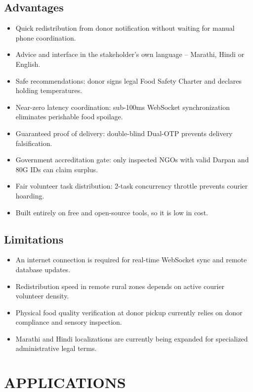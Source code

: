 \documentclass[12pt,a4paper]{article}
\begin{document}
\subsection{Advantages}
\begin{itemize}
    \item Quick redistribution from donor notification without waiting for manual phone coordination.
    \item Advice and interface in the stakeholder's own language -- Marathi, Hindi or English.
    \item Safe recommendations: donor signs legal Food Safety Charter and declares holding temperatures.
    \item Near-zero latency coordination: sub-100ms WebSocket synchronization eliminates perishable food spoilage.
    \item Guaranteed proof of delivery: double-blind Dual-OTP prevents delivery falsification.
    \item Government accreditation gate: only inspected NGOs with valid Darpan and 80G IDs can claim surplus.
    \item Fair volunteer task distribution: 2-task concurrency throttle prevents courier hoarding.
    \item Built entirely on free and open-source tools, so it is low in cost.
\end{itemize}

\subsection{Limitations}
\begin{itemize}
    \item An internet connection is required for real-time WebSocket sync and remote database updates.
    \item Redistribution speed in remote rural zones depends on active courier volunteer density.
    \item Physical food quality verification at donor pickup currently relies on donor compliance and sensory inspection.
    \item Marathi and Hindi localizations are currently being expanded for specialized administrative legal terms.
\end{itemize}

\newpage
\section{APPLICATIONS}
\end{document}
